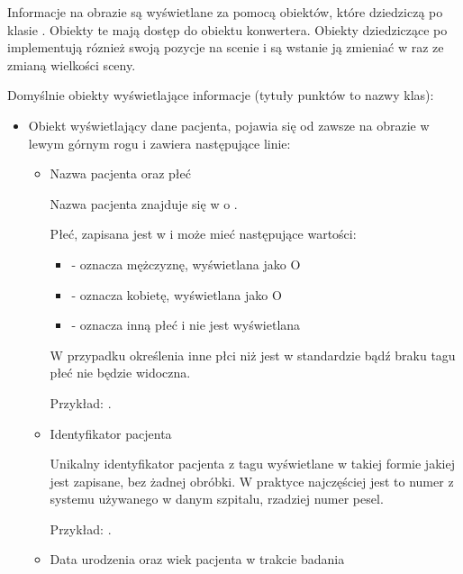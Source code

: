 
Informacje na obrazie są wyświetlane za pomocą obiektów, które dziedziczą po klasie .
Obiekty te mają dostęp do obiektu konwertera.
Obiekty dziedziczące po  implementują róznież swoją pozycje na scenie i są wstanie ją zmieniać w raz ze zmianą wielkości sceny.


Domyślnie obiekty wyświetlające informacje (tytuły punktów to nazwy klas):
\begin{itemize}

    \item {}

          Obiekt wyświetlający dane pacjenta, pojawia się od zawsze na obrazie w lewym górnym rogu i zawiera następujące linie:
          \begin{itemize}
              \item Nazwa pacjenta oraz płeć

                    Nazwa pacjenta znajduje się w  o .

                    Płeć, zapisana jest w  i może mieć następujące wartości:
                    \begin{itemize}
                        \item {} - oznacza mężczyznę, wyświetlana jako O
                        \item {} - oznacza kobietę, wyświetlana jako O
                        \item {} - oznacza inną płeć i nie jest wyświetlana
                    \end{itemize}

                    W przypadku określenia inne płci niż jest w standardzie bądź braku tagu płeć nie będzie widoczna.

                    Przykład: .

              \item Identyfikator pacjenta

                    Unikalny identyfikator pacjenta z tagu  wyświetlane w takiej formie jakiej jest zapisane, bez żadnej obróbki.
                    W praktyce najczęściej jest to numer z systemu używanego w danym szpitalu, rzadziej numer pesel.

                    Przykład: .

              \item Data urodzenia oraz wiek pacjenta w trakcie badania


\end{itemize}
\end{itemize}
